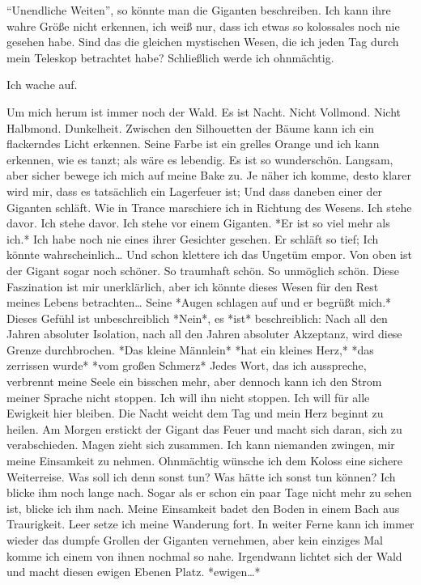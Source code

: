 \documentclass{article}
\begin{document}
	“Unendliche Weiten”, so könnte man die Giganten beschreiben. Ich kann ihre wahre Größe nicht erkennen, ich weiß nur, dass ich etwas so kolossales noch nie gesehen habe. Sind das die gleichen mystischen Wesen, die ich jeden Tag durch mein Teleskop betrachtet habe? Schließlich werde ich ohnmächtig.
	
	\medskip
	
	Ich wache auf.  
	
	Um mich herum ist immer noch der Wald. Es ist Nacht. Nicht Vollmond. Nicht Halbmond. Dunkelheit. Zwischen den Silhouetten der Bäume kann ich ein flackerndes Licht erkennen. Seine Farbe ist ein grelles Orange und ich kann erkennen, wie es tanzt; als wäre es lebendig. Es ist so wunderschön. Langsam, aber sicher bewege ich mich auf meine Bake zu. Je näher ich komme, desto klarer wird mir, dass es tatsächlich ein Lagerfeuer ist; Und dass daneben einer der Giganten schläft. Wie in Trance marschiere ich in Richtung des Wesens. Ich stehe davor. Ich stehe davor. Ich stehe vor einem Giganten. *Er ist so viel mehr als ich.* Ich habe noch nie eines ihrer Gesichter gesehen. Er schläft so tief; Ich könnte wahrscheinlich… Und schon klettere ich das Ungetüm empor. Von oben ist der Gigant sogar noch schöner. So traumhaft schön. So unmöglich schön. Diese Faszination ist mir unerklärlich, aber ich könnte dieses Wesen für den Rest meines Lebens betrachten… Seine *Augen schlagen auf und er begrüßt mich.* Dieses Gefühl ist unbeschreiblich \- *Nein*, es *ist* beschreiblich: Nach all den Jahren absoluter Isolation, nach all den Jahren absoluter Akzeptanz, wird diese Grenze durchbrochen.  
	*Das kleine Männlein*  
	*hat ein kleines Herz,*  
	*das zerrissen wurde*  
	*vom großen Schmerz*  
	Jedes Wort, das ich ausspreche, verbrennt meine Seele ein bisschen mehr, aber dennoch kann ich den Strom meiner Sprache nicht stoppen. Ich will ihn nicht stoppen. Ich will für alle Ewigkeit hier bleiben. Die Nacht weicht dem Tag und mein Herz beginnt zu heilen. Am Morgen erstickt der Gigant das Feuer und macht sich daran, sich zu verabschieden. Magen zieht sich zusammen. Ich kann niemanden zwingen, mir meine Einsamkeit zu nehmen. Ohnmächtig wünsche ich dem Koloss eine sichere Weiterreise. Was soll ich denn sonst tun? Was hätte ich sonst tun können? Ich blicke ihm noch lange nach. Sogar als er schon ein paar Tage nicht mehr zu sehen ist, blicke ich ihm nach. Meine Einsamkeit badet den Boden in einem Bach aus Traurigkeit. Leer setze ich meine Wanderung fort. In weiter Ferne kann ich immer wieder das dumpfe Grollen der Giganten vernehmen, aber kein einziges Mal komme ich einem von ihnen nochmal so nahe. Irgendwann lichtet sich der Wald und macht diesen ewigen Ebenen Platz. *ewigen…*
	
\end{document}
